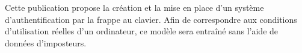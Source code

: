 Cette publication propose la création et la mise en place d'un système d'authentification par la frappe au clavier. Afin de correspondre aux conditions d'utilisation réelles d'un ordinateur, ce modèle sera entraîné sans l'aide de données d'imposteurs.